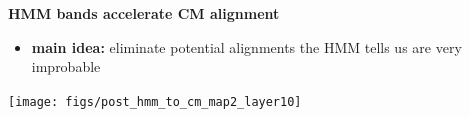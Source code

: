 \documentclass[landscape]{slides}
\begin{document}
\begin{slide}
\begin{center}

\textbf{HMM bands accelerate CM alignment}
\end{center}
\medskip
\small
\begin{itemize}
\item
\textbf{main idea:} eliminate potential alignments the HMM tells us are very improbable
\end{itemize}
\begin{center}
\texttt{[image: figs/post\_hmm\_to\_cm\_map2\_layer10]}
\end{center}
\vfill
\end{slide}
\end{document}
